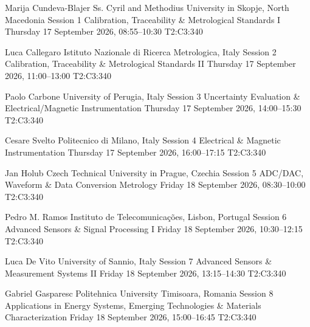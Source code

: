\documentclass[a4paper,landscape,11pt]{article}
\begin{document}
\tentcard
  {Marija Cundeva-Blajer}
  {Ss. Cyril and Methodius University in Skopje, North Macedonia}
  {Session 1}
  {Calibration, Traceability \& Metrological Standards I}
  {Thursday 17 September 2026, 08:55--10:30}
  {T2:C3:340}

\tentcard
  {Luca Callegaro}
  {Istituto Nazionale di Ricerca Metrologica, Italy}
  {Session 2}
  {Calibration, Traceability \& Metrological Standards II}
  {Thursday 17 September 2026, 11:00--13:00}
  {T2:C3:340}

\tentcard
  {Paolo Carbone}
  {University of Perugia, Italy}
  {Session 3}
  {Uncertainty Evaluation \& Electrical/Magnetic Instrumentation}
  {Thursday 17 September 2026, 14:00--15:30}
  {T2:C3:340}

\tentcard
  {Cesare Svelto}
  {Politecnico di Milano, Italy}
  {Session 4}
  {Electrical \& Magnetic Instrumentation}
  {Thursday 17 September 2026, 16:00--17:15}
  {T2:C3:340}

\tentcard
  {Jan Holub}
  {Czech Technical University in Prague, Czechia}
  {Session 5}
  {ADC/DAC, Waveform \& Data Conversion Metrology}
  {Friday 18 September 2026, 08:30--10:00}
  {T2:C3:340}

\tentcard
  {Pedro M. Ramos}
  {Instituto de Telecomunica\c{c}\~oes, Lisbon, Portugal}
  {Session 6}
  {Advanced Sensors \& Signal Processing I}
  {Friday 18 September 2026, 10:30--12:15}
  {T2:C3:340}

\tentcard
  {Luca De Vito}
  {University of Sannio, Italy}
  {Session 7}
  {Advanced Sensors \& Measurement Systems II}
  {Friday 18 September 2026, 13:15--14:30}
  {T2:C3:340}

\tentcard
  {Gabriel Gasparesc}
  {Politehnica University Timisoara, Romania}
  {Session 8}
  {Applications in Energy Systems, Emerging Technologies \& Materials Characterization}
  {Friday 18 September 2026, 15:00--16:45}
  {T2:C3:340}
\end{document}
